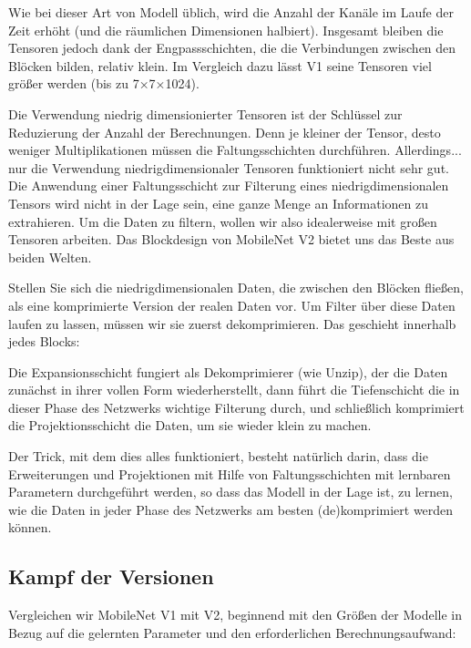 
Wie bei dieser Art von Modell üblich, wird die Anzahl der Kanäle im Laufe der Zeit erhöht (und die räumlichen Dimensionen halbiert). Insgesamt bleiben die Tensoren jedoch dank der Engpassschichten, die die Verbindungen zwischen den Blöcken bilden, relativ klein. Im Vergleich dazu lässt V1 seine Tensoren viel größer werden (bis zu 7×7×1024).

Die Verwendung niedrig dimensionierter Tensoren ist der Schlüssel zur Reduzierung der Anzahl der Berechnungen. Denn je kleiner der Tensor, desto weniger Multiplikationen müssen die Faltungsschichten durchführen.
Allerdings... nur die Verwendung niedrigdimensionaler Tensoren funktioniert nicht sehr gut. Die Anwendung einer Faltungsschicht zur Filterung eines niedrigdimensionalen Tensors wird nicht in der Lage sein, eine ganze Menge an Informationen zu extrahieren. Um die Daten zu filtern, wollen wir also idealerweise mit großen Tensoren arbeiten. Das Blockdesign von MobileNet V2 bietet uns das Beste aus beiden Welten.

Stellen Sie sich die niedrigdimensionalen Daten, die zwischen den Blöcken fließen, als eine komprimierte Version der realen Daten vor. Um Filter über diese Daten laufen zu lassen, müssen wir sie zuerst dekomprimieren. Das geschieht innerhalb jedes Blocks:


Die Expansionsschicht fungiert als Dekomprimierer (wie Unzip), der die Daten zunächst in ihrer vollen Form wiederherstellt, dann führt die Tiefenschicht die in dieser Phase des Netzwerks wichtige Filterung durch, und schließlich komprimiert die Projektionsschicht die Daten, um sie wieder klein zu machen.

Der Trick, mit dem dies alles funktioniert, besteht natürlich darin, dass die Erweiterungen und Projektionen mit Hilfe von Faltungsschichten mit lernbaren Parametern durchgeführt werden, so dass das Modell in der Lage ist, zu lernen, wie die Daten in jeder Phase des Netzwerks am besten (de)komprimiert werden können.

\subsection{Kampf der Versionen}
Vergleichen wir MobileNet V1 mit V2, beginnend mit den Größen der Modelle in Bezug auf die gelernten Parameter und den erforderlichen Berechnungsaufwand:

